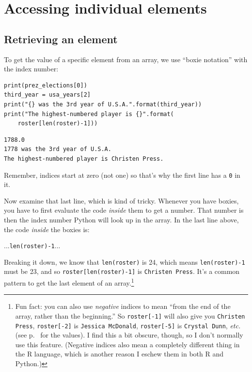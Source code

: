 \section{Accessing individual elements}

\subsection{Retrieving an element}

To get the value of a specific element from an array, we use ``boxie notation''
with the index number:

\begin{Verbatim}[fontsize=\small,samepage=true,frame=single,framesep=3mm]
print(prez_elections[0])
third_year = usa_years[2]
print("{} was the 3rd year of U.S.A.".format(third_year))
print("The highest-numbered player is {}".format(
    roster[len(roster)-1]))
\end{Verbatim}

\begin{Verbatim}[fontsize=\small,samepage=true,frame=leftline,framesep=5mm,framerule=1mm]
1788.0
1778 was the 3rd year of U.S.A.
The highest-numbered player is Christen Press.
\end{Verbatim}

Remember, indices start at zero (not one) so that's why the first line has a
\texttt{0} in it.

Now examine that last line, which is kind of tricky. Whenever you have boxies,
you have to first evaluate the code \textit{inside} them to get a number. That
number is then the index number Python will look up in the array. In the last
line above, the code \textit{inside} the boxies is:

\quad\quad\quad   ...\texttt{len(roster)-1}...

Breaking it down, we know that \texttt{len(roster)} is 24, which means
\texttt{len(roster)-1} must be 23, and so \texttt{roster[len(roster)-1]} is
\texttt{Christen Press}. It's a common pattern to get the last element of an
array.\footnote{Fun fact: you can also use \textit{negative} indices to mean
``from the end of the array, rather than the beginning.'' So
\texttt{roster[-1]} will also give you \texttt{Christen Press},
\texttt{roster[-2]} is \texttt{Jessica McDonald},
\texttt{roster[-5]} is \texttt{Crystal Dunn}, \textit{etc.} (see
p.~\pageref{rosterNames} for the values). I find this a bit obscure, though, so
I don't normally use this feature. (Negative indices also mean a completely
different thing in the R language, which is another reason I eschew them in
both R and Python.)}

